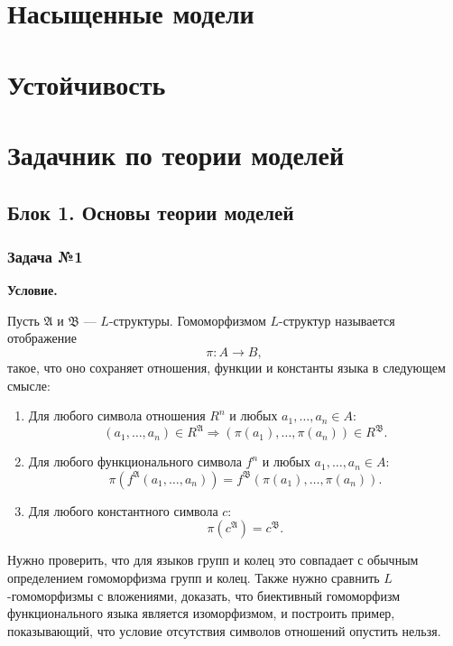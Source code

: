 \documentclass[12pt,a4paper,oneside,openany]{book}
\theoremstyle{definition}
\theoremstyle{plain}
\theoremstyle{remark}
\begin{document}
\section{Насыщенные модели}
\section{Устойчивость}

\section{Задачник по теории моделей}

\subsection{Блок 1. Основы теории моделей}

\subsubsection*{Задача №1}

\par\medskip
\textbf{Условие.}
\par\smallskip
Пусть $\mathfrak A$ и $\mathfrak B$ — $L$-структуры. Гомоморфизмом $L$-структур называется отображение
\[
\pi:A\to B,
\]
такое, что оно сохраняет отношения, функции и константы языка в следующем смысле:

\begin{enumerate}
\item Для любого символа отношения $R^n$ и любых $a_1,\dots,a_n\in A$:
\[
(a_1,\dots,a_n)\in R^{\mathfrak A}
\Rightarrow
(\pi(a_1),\dots,\pi(a_n))\in R^{\mathfrak B}.
\]

\item Для любого функционального символа $f^n$ и любых $a_1,\dots,a_n\in A$:
\[
\pi(f^{\mathfrak A}(a_1,\dots,a_n))
=
f^{\mathfrak B}(\pi(a_1),\dots,\pi(a_n)).
\]

\item Для любого константного символа $c$:
\[
\pi(c^{\mathfrak A})=c^{\mathfrak B}.
\]

\end{enumerate}

Нужно проверить, что для языков групп и колец это совпадает с обычным определением гомоморфизма групп и колец. Также нужно сравнить $L$-гомоморфизмы с вложениями, доказать, что биективный гомоморфизм функционального языка является изоморфизмом, и построить пример, показывающий, что условие отсутствия символов отношений опустить нельзя.
\end{document}
